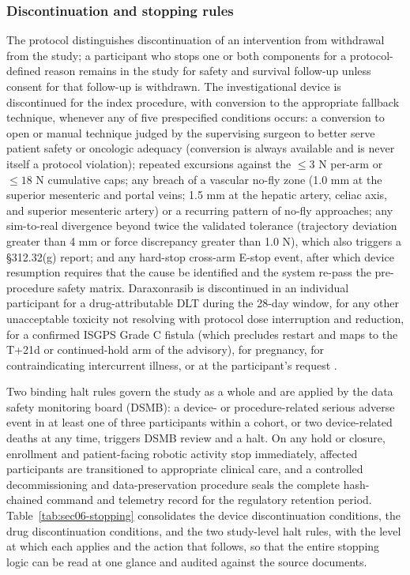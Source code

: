 \subsubsection*{Discontinuation and stopping rules}

The protocol distinguishes discontinuation of an intervention from withdrawal from
the study; a participant who stops one or both components for a protocol-defined
reason remains in the study for safety and survival follow-up unless consent for that
follow-up is withdrawn. The investigational device is discontinued for the index
procedure, with conversion to the appropriate fallback technique, whenever any of
five prespecified conditions occurs: a conversion to open or manual technique judged
by the supervising surgeon to better serve patient safety or oncologic adequacy
(conversion is always available and is never itself a protocol violation); repeated
excursions against the $\leq 3$ N per-arm or $\leq 18$ N cumulative caps; any breach
of a vascular no-fly zone (1.0 mm at the superior mesenteric and portal veins;
1.5 mm at the hepatic artery, celiac axis, and superior mesenteric artery) or a
recurring pattern of no-fly approaches; any sim-to-real divergence beyond twice the
validated tolerance (trajectory deviation greater than 4 mm or force discrepancy
greater than 1.0 N), which also triggers a \S 312.32(g) report; and any hard-stop
cross-arm E-stop event, after which device resumption requires that the cause be
identified and the system re-pass the pre-procedure safety matrix. Daraxonrasib is
discontinued in an individual participant for a drug-attributable DLT during the
28-day window, for any other unacceptable toxicity not resolving with protocol dose
interruption and reduction, for a confirmed ISGPS Grade C fistula (which precludes
restart and maps to the T+21d or continued-hold arm of the advisory), for pregnancy,
for contraindicating intercurrent illness, or at the participant's request
\cite{onpremwhippl,daraxwhipple}.

Two binding halt rules govern the study as a whole and are applied by the data
safety monitoring board (DSMB): a device- or procedure-related serious adverse event
in at least one of three participants within a cohort, or two device-related deaths
at any time, triggers DSMB review and a halt. On any hold or closure, enrollment and
patient-facing robotic activity stop immediately, affected participants are
transitioned to appropriate clinical care, and a controlled decommissioning and
data-preservation procedure seals the complete hash-chained command and telemetry
record for the regulatory retention period. Table~\ref{tab:sec06-stopping}
consolidates the device discontinuation conditions, the drug discontinuation
conditions, and the two study-level halt rules, with the level at which each applies
and the action that follows, so that the entire stopping logic can be read at one
glance and audited against the source documents.

